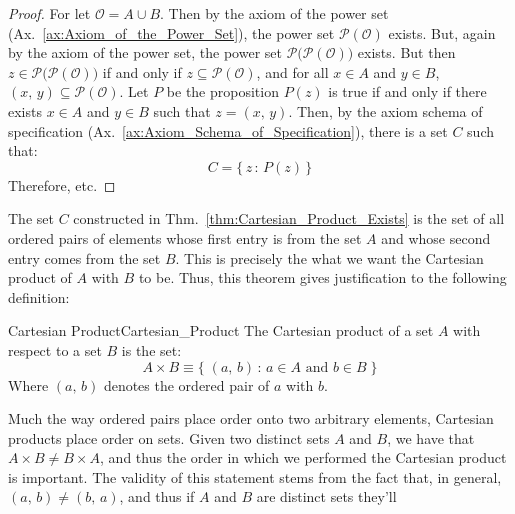         \begin{proof}
            For let $\mathcal{O}=A\cup{B}$. Then by the axiom of the power set
            (Ax.~\ref{ax:Axiom_of_the_Power_Set}), the power set
            $\mathcal{P}(\mathcal{O})$ exists. But, again by the axiom of the
            power set, the power set
            $\mathcal{P}\big(\mathcal{P}(\mathcal{O})\big)$ exists. But then
            $z\in\mathcal{P}\big(\mathcal{P}(\mathcal{O})\big)$
            if and only if $z\subseteq\mathcal{P}(\mathcal{O})$, and for all
            $x\in{A}$ and $y\in{B}$,
            $(x,\,y)\subseteq\mathcal{P}(\mathcal{O})$. Let $P$ be the
            proposition $P(z)$ is true if and only if there exists $x\in{A}$
            and $y\in{B}$ such that $z=(x,\,y)$. Then, by the axiom schema of
            specification (Ax.~\ref{ax:Axiom_Schema_of_Specification}),
            there is a set $C$ such that:
            \begin{equation}
                C=\{\,z\,:\,P(z)\,\}
            \end{equation}
            Therefore, etc.
        \end{proof}
        The set $C$ constructed in Thm.~\ref{thm:Cartesian_Product_Exists} is
        the set of all ordered pairs of elements whose first entry is from the
        set $A$ and whose second entry comes from the set $B$. This is
        precisely the what we want the Cartesian product of $A$ with $B$ to
        be. Thus, this theorem gives justification to the following
        definition:
        \begin{ldefinition}{Cartesian Product}{Cartesian_Product}
            The \gls{Cartesian product} of a set $A$ with respect to a set
            $B$ is the set:
            \begin{equation}
                A\times{B}\equiv\{\;(a,\,b)\,:\,a\in{A}
                                    \textrm{ and }b\in{B}\;\}
            \end{equation}
            Where $(a,\,b)$ denotes the ordered pair of $a$ with $b$.
        \end{ldefinition}
        Much the way ordered pairs place order onto two arbitrary elements,
        Cartesian products place order on sets. Given two distinct sets $A$
        and $B$, we have that $A\times{B}\ne{B}\times{A}$, and thus the
        order in which we performed the Cartesian product is important. The
        validity of this statement stems from the fact that, in general,
        $(a,\,b)\ne(b,\,a)$, and thus if $A$ and $B$ are distinct sets they'll
